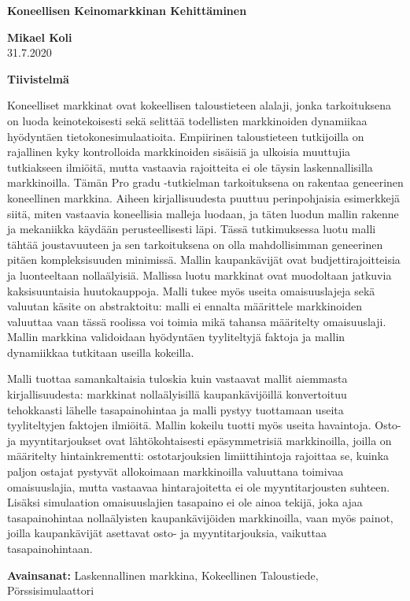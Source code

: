 

\thispagestyle{plain}
\begin{center}
    \Large
    \textbf{Koneellisen Keinomarkkinan Kehitt\"aminen}
        
    \vspace{0.4cm}
    \large
        
    \vspace{0.4cm}
    \textbf{Mikael Koli} \\
    31.7.2020 %
       
    \vspace{0.9cm}
    \textbf{Tiivistelmä}
\end{center}

Koneelliset markkinat ovat kokeellisen taloustieteen alalaji, jonka tarkoituksena
on luoda keinotekoisesti sekä selittää todellisten markkinoiden dynamiikaa hyödyntäen
tietokonesimulaatioita. Empiirinen taloustieteen tutkijoilla on rajallinen kyky kontrolloida
markkinoiden sisäisiä ja ulkoisia muuttujia tutkiakseen ilmiöitä, mutta vastaavia rajoitteita
ei ole täysin laskennallisilla markkinoilla. Tämän Pro gradu -tutkielman tarkoituksena on rakentaa
geneerinen koneellinen markkina. Aiheen kirjallisuudesta puuttuu perinpohjaisia esimerkkejä siitä,
miten vastaavia koneellisia malleja luodaan, ja täten luodun mallin rakenne ja mekaniikka käydään
perusteellisesti läpi. Tässä tutkimuksessa luotu malli tähtää joustavuuteen ja sen tarkoituksena on
olla mahdollisimman geneerinen pitäen kompleksisuuden minimissä. Mallin kaupankävijät ovat budjettirajoitteisia
ja luonteeltaan nollaälyisiä. Mallissa luotu markkinat ovat muodoltaan jatkuvia
kaksisuuntaisia huutokauppoja. Malli tukee myös useita omaisuuslajeja sekä valuutan käsite on abstraktoitu: 
malli ei ennalta määrittele markkinoiden valuuttaa vaan tässä roolissa voi toimia mikä tahansa määritelty
omaisuuslaji. Mallin markkina validoidaan hyödyntäen tyyliteltyjä faktoja ja mallin dynamiikkaa
tutkitaan useilla kokeilla.

Malli tuottaa samankaltaisia tuloskia kuin vastaavat mallit aiemmasta kirjallisuudesta: markkinat nollaälyisillä
kaupankävijöillä konvertoituu tehokkaasti lähelle tasapainohintaa ja malli pystyy tuottamaan useita tyyliteltyjen 
faktojen ilmiöitä. Mallin kokeilu tuotti myös useita havaintoja. Osto- ja myyntitarjoukset ovat lähtökohtaisesti 
epäsymmetrisiä markkinoilla, joilla on määritelty hintainkrementti: ostotarjouksien limiittihintoja rajoittaa 
se, kuinka paljon ostajat pystyvät allokoimaan markkinoilla valuuttana toimivaa omaisuuslajia, mutta vastaavaa 
hintarajoitetta ei ole myyntitarjousten suhteen. Lisäksi simulaation omaisuuslajien tasapaino ei ole ainoa tekijä,
joka ajaa tasapainohintaa nollaälyisten kaupankävijöiden markkinoilla, vaan myös painot, joilla kaupankävijät 
asettavat osto- ja myyntitarjouksia, vaikuttaa tasapainohintaan.

\textbf{Avainsanat:} Laskennallinen markkina, Kokeellinen Taloustiede, Pörssisimulaattori